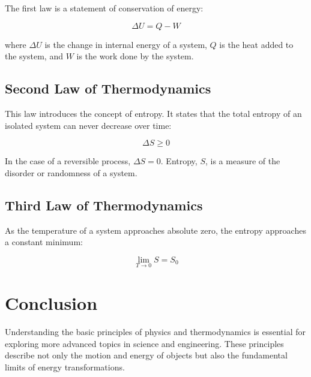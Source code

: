 \documentclass[12pt]{article}
\begin{document}
The first law is a statement of conservation of energy:

\[
\Delta U = Q - W
\]

where $\Delta U$ is the change in internal energy of a system, $Q$ is the heat added to the system, and $W$ is the work done by the system.

\subsection{Second Law of Thermodynamics}

This law introduces the concept of entropy. It states that the total entropy of an isolated system can never decrease over time:

\[
\Delta S \geq 0
\]

In the case of a reversible process, $\Delta S = 0$. Entropy, $S$, is a measure of the disorder or randomness of a system.

\subsection{Third Law of Thermodynamics}

As the temperature of a system approaches absolute zero, the entropy approaches a constant minimum:

\[
\lim_{T \to 0} S = S_0
\]

\section{Conclusion}

Understanding the basic principles of physics and thermodynamics is essential for exploring more advanced topics in science and engineering. These principles describe not only the motion and energy of objects but also the fundamental limits of energy transformations.
\end{document}
